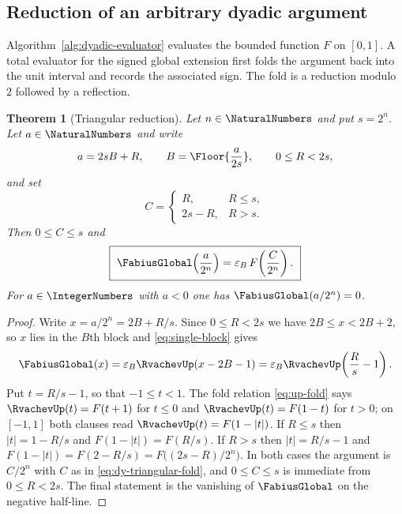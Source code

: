 \documentclass[11pt,oneside]{article}
\newtheorem{theorem}{Theorem}[section]
\theoremstyle{definition}
\theoremstyle{remark}
\begin{document}
\subsection{Reduction of an arbitrary dyadic argument}
\label{subsec:dy-triangular}

Algorithm~\ref{alg:dyadic-evaluator} evaluates the bounded function $F$ on $[0,1]$.  A total
evaluator for the signed global extension first folds the argument back into the unit interval
and records the associated sign.  The fold is a reduction modulo $2$ followed by a reflection.

\begin{theorem}[Triangular reduction]
\label{thm:dy-triangular}
Let $n\in\NaturalNumbers$ and put $s=2^n$.  Let $a\in\NaturalNumbers$ and write
\begin{equation}
 a=2sB+R,\qquad B=\Floor{\frac a{2s}},\qquad 0\le R<2s,
                                                               \label{eq:dy-triangular-split}
\end{equation}
and set
\begin{equation}
 C=\begin{cases}R,&R\le s,\\ 2s-R,&R>s.\end{cases}
                                                               \label{eq:dy-triangular-fold}
\end{equation}
Then $0\le C\le s$ and
\begin{equation}
\boxed{\ \FabiusGlobal\!\left(\frac a{2^n}\right)=\varepsilon_B\,F\!\left(\frac C{2^n}\right).\ }
                                                               \label{eq:dy-triangular}
\end{equation}
For $a\in\IntegerNumbers$ with $a<0$ one has $\FabiusGlobal(a/2^n)=0$.
\end{theorem}

\begin{proof}
Write $x=a/2^n=2B+R/s$.  Since $0\le R<2s$ we have $2B\le x<2B+2$, so $x$ lies in the
$B$th block and \eqref{eq:single-block} gives
\begin{equation*}
 \FabiusGlobal(x)=\varepsilon_B\RvachevUp(x-2B-1)=\varepsilon_B\RvachevUp\!\left(\frac Rs-1\right).
\end{equation*}
Put $t=R/s-1$, so that $-1\le t<1$.  The fold relation \eqref{eq:up-fold} says
$\RvachevUp(t)=F(t+1)$ for $t\le0$ and $\RvachevUp(t)=F(1-t)$ for $t>0$; on $[-1,1]$ both clauses read
$\RvachevUp(t)=F(1-|t|)$.  If $R\le s$ then $|t|=1-R/s$ and $F(1-|t|)=F(R/s)$.  If $R>s$ then
$|t|=R/s-1$ and $F(1-|t|)=F(2-R/s)=F\bigl((2s-R)/2^n\bigr)$.  In both cases the argument is
$C/2^n$ with $C$ as in \eqref{eq:dy-triangular-fold}, and $0\le C\le s$ is immediate from
$0\le R<2s$.  The final statement is the vanishing of $\FabiusGlobal$ on the negative half-line.
\end{proof}
\end{document}
